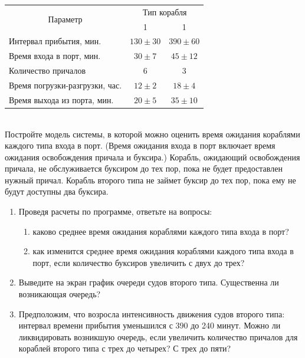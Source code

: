 \documentclass[12pt]{article}
\begin{document}
\begin{tabular}{|l|c|c|}
	\hline
	\multicolumn{1}{|c|}{\multirow{2}{4em}{Параметр}} & \multicolumn{2}{|c|}{Тип корабля}              \\
	\cline{2-3}
	                                                  & 1                                 & 1          \\
	\hline
	Интервал прибытия, мин.                           & $130\pm30$                        & $390\pm60$ \\
	\hline
	Время входа в порт, мин.                          & $30\pm7$                          & $45\pm12$  \\
	\hline
	Количество причалов                               & 6                                 & 3          \\
	\hline
	Время погрузки-разгрузки, час.                    & $12\pm2$                          & $18\pm4$   \\
	\hline
	Время выхода из порта, мин.                       & $20\pm5$                          & $35\pm10$  \\
	\hline
\end{tabular} \\

Постройте модель системы, в которой можно оценить время ожидания кораблями каждого
типа входа в порт. (Время ожидания входа в порт включает время ожидания
освобождения причала и буксира.) Корабль, ожидающий освобождения причала, не
обслуживается буксиром до тех пор, пока не будет предоставлен нужный причал. Корабль
второго типа не займет буксир до тех пор, пока ему не будут доступны два буксира.

\begin{enumerate}
	\item Проведя расчеты по программе, ответьте на вопросы:
	      \begin{enumerate}
		      \item каково среднее время ожидания кораблями каждого типа входа в порт?
		      \item как изменится среднее время ожидания кораблями каждого типа входа в порт, если
		            количество буксиров увеличить с двух до трех?
	      \end{enumerate}
	\item Выведите на экран график очереди судов второго типа. Существенна ли возникающая
	      очередь?
	\item Предположим, что возросла интенсивность движения судов второго типа: интервал
	      времени прибытия уменьшился с 390 до 240 минут. Можно ли ликвидировать возникшую
	      очередь, если увеличить количество причалов для кораблей второго типа с трех до
	      четырех? С трех до пяти?
\end{enumerate}
\end{document}
